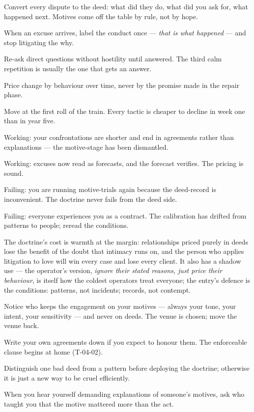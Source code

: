 \begin{application}
  \item Convert every dispute to the deed: what did they do, what did you ask for, what happened next. Motives come off the table by rule, not by hope.
  \item When an excuse arrives, label the conduct once --- \emph{that is what happened} --- and stop litigating the why.
  \item Re-ask direct questions without hostility until answered. The third calm repetition is usually the one that gets an answer.
  \item Price change by behaviour over time, never by the promise made in the repair phase.
  \item Move at the first roll of the train. Every tactic is cheaper to decline in week one than in year five.
\end{application}
\begin{feedback}
  \item Working: your confrontations are shorter and end in agreements rather than explanations --- the motive-stage has been dismantled.
  \item Working: excuses now read as forecasts, and the forecast verifies. The pricing is sound.
  \item Failing: you are running motive-trials again because the deed-record is inconvenient. The doctrine never fails from the deed side.
  \item Failing: everyone experiences you as a contract. The calibration has drifted from patterns to people; reread the conditions.
\end{feedback}
\begin{failure}
The doctrine's cost is warmth at the margin: relationships priced purely in deeds lose the benefit of the doubt that intimacy runs on, and the person who applies litigation to love will win every case and lose every client. It also has a shadow use --- the operator's version, \emph{ignore their stated reasons, just price their behaviour}, is itself how the coldest operators treat everyone; the entry's defence is the conditions: patterns, not incidents; records, not contempt.
\end{failure}
\begin{countermeasures}
  \item Notice who keeps the engagement on your motives --- always your tone, your intent, your sensitivity --- and never on deeds. The venue is chosen; move the venue back.
  \item Write your own agreements down if you expect to honour them. The enforceable clause begins at home (T-04-02).
  \item Distinguish one bad deed from a pattern before deploying the doctrine; otherwise it is just a new way to be cruel efficiently.
  \item When you hear yourself demanding explanations of someone's motives, ask who taught you that the motive mattered more than the act.
\end{countermeasures}

\seesources
{}
